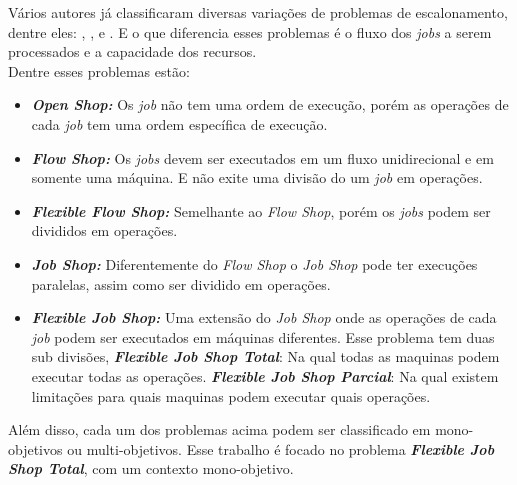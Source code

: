 Vários autores já classificaram diversas variações de problemas de escalonamento, dentre eles: \cite{graham1979}, \cite{Lenstra1979}, e \cite{maccarthy1993}. E o que diferencia esses problemas é o fluxo dos \textit{jobs} a serem processados e a capacidade dos recursos.\\
\noindent Dentre esses problemas estão:
\begin{itemize}
    \item \textbf{\textit{Open Shop:}} Os \textit{job} não tem uma ordem de execução, porém as operações de cada \textit{job} tem uma ordem específica de execução.
    
    \item \textbf{\textit{Flow Shop:}} Os \textit{jobs} devem ser executados em um fluxo unidirecional e em somente uma máquina. E não exite uma divisão do um \textit{job} em operações.
    
    \item \textbf{\textit{Flexible Flow Shop:}} Semelhante ao \textit{Flow Shop}, porém os \textit{jobs} podem ser divididos em operações.
    
    \item \textbf{\textit{Job Shop:}} Diferentemente do \textit{Flow Shop} o \textit{Job Shop} pode ter execuções paralelas, assim como ser dividido em operações.
    
    \item \textbf{\textit{Flexible Job Shop:}} Uma extensão do \textit{Job Shop} onde as operações de cada \textit{job} podem ser executados em máquinas diferentes. Esse problema tem duas sub divisões, 
    \subitem \textbf{\textit{Flexible Job Shop Total}}: Na qual todas as maquinas podem executar todas as operações. 
    \subitem \textbf{\textit{Flexible Job Shop Parcial}}: Na qual existem limitações para quais maquinas podem executar quais operações.
\end{itemize}

\noindent Além disso, cada um dos problemas acima podem ser classificado em mono-objetivos ou multi-objetivos. Esse trabalho é focado no problema \textbf{\textit{Flexible Job Shop Total}}, com um contexto mono-objetivo.\\

%


